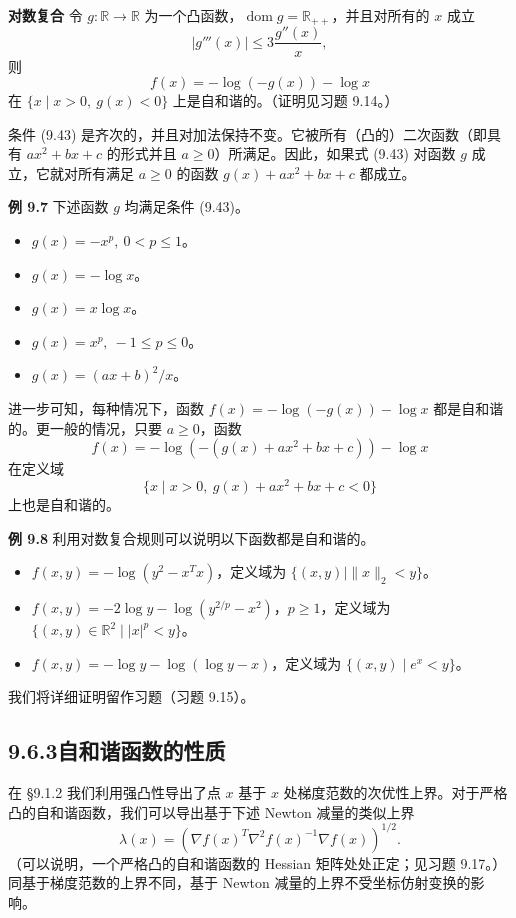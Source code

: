 \documentclass[UTF8,12pt,a4paper,fontset=fandol]{ctexart}
\begin{document}
\noindent\textbf{对数复合}\quad
令 $g:\mathbb{R}\to\mathbb{R}$ 为一个凸函数，$\operatorname{dom} g=\mathbb{R}_{++}$，并且对所有的 $x$ 成立
\begin{equation}
|g'''(x)|\leq 3\frac{g''(x)}{x},
\tag{9.43}
\end{equation}
则
\[
f(x)=-\log(-g(x))-\log x
\]
在 $\{x\mid x>0,\ g(x)<0\}$ 上是自和谐的。（证明见习题 9.14。）

条件 (9.43) 是齐次的，并且对加法保持不变。它被所有（凸的）二次函数（即具有 $ax^2+bx+c$ 的形式并且 $a\geq0$）所满足。因此，如果式 (9.43) 对函数 $g$ 成立，它就对所有满足 $a\geq0$ 的函数 $g(x)+ax^2+bx+c$ 都成立。

\noindent\textbf{例 9.7}\quad
下述函数 $g$ 均满足条件 (9.43)。
\begin{itemize}
\item $g(x)=-x^p,\ 0<p\leq1$。
\item $g(x)=-\log x$。
\item $g(x)=x\log x$。
\item $g(x)=x^p,\ -1\leq p\leq0$。
\item $g(x)=(ax+b)^2/x$。
\end{itemize}
进一步可知，每种情况下，函数 $f(x)=-\log(-g(x))-\log x$ 都是自和谐的。更一般的情况，只要 $a\geq0$，函数
\[
f(x)=-\log(-(g(x)+ax^2+bx+c))-\log x
\]
在定义域
\[
\{x\mid x>0,\ g(x)+ax^2+bx+c<0\}
\]
上也是自和谐的。

\noindent\textbf{例 9.8}\quad
利用对数复合规则可以说明以下函数都是自和谐的。
\begin{itemize}
\item $f(x,y)=-\log(y^2-x^Tx)$，定义域为 $\{(x,y)\mid \|x\|_2<y\}$。
\item $f(x,y)=-2\log y-\log(y^{2/p}-x^2)$，$p\geq1$，定义域为 $\{(x,y)\in\mathbb{R}^2\mid |x|^p<y\}$。
\item $f(x,y)=-\log y-\log(\log y-x)$，定义域为 $\{(x,y)\mid e^x<y\}$。
\end{itemize}
我们将详细证明留作习题（习题 9.15）。

\subsection*{9.6.3\quad 自和谐函数的性质}

在 \S9.1.2 我们利用强凸性导出了点 $x$ 基于 $x$ 处梯度范数的次优性上界。对于严格凸的自和谐函数，我们可以导出基于下述 Newton 减量的类似上界
\[
\lambda(x)=\left(\nabla f(x)^T\nabla^2 f(x)^{-1}\nabla f(x)\right)^{1/2}.
\]
（可以说明，一个严格凸的自和谐函数的 Hessian 矩阵处处正定；见习题 9.17。）同基于梯度范数的上界不同，基于 Newton 减量的上界不受坐标仿射变换的影响。
\end{document}
